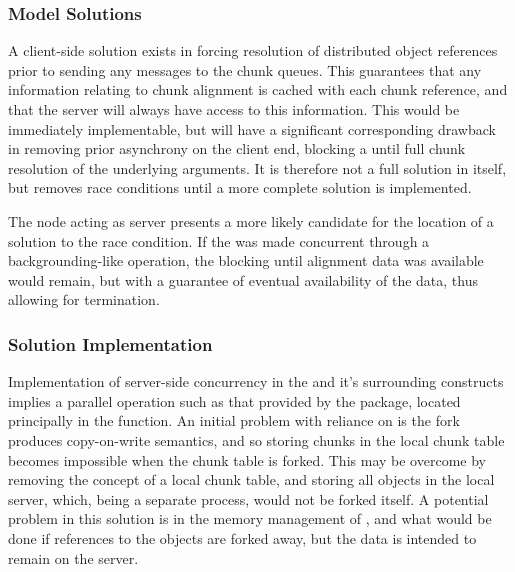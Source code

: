 
\subsubsection{Model Solutions}

A client-side solution exists in forcing resolution of distributed object
references prior to sending any messages to the chunk queues.
This guarantees that any information relating to chunk alignment is cached with
each chunk reference, and that the server will always have access to this
information.
This would be immediately implementable, but will have a significant
corresponding drawback in removing prior asynchrony on the client end, blocking
a  until full chunk resolution of the
underlying arguments.
It is therefore not a full solution in itself, but removes race conditions
until a more complete solution is implemented.

The node acting as server presents a more likely candidate for the location of
a solution to the race condition.
If the  was made concurrent through a
backgrounding-like operation, the blocking until alignment data was available
would remain, but with a guarantee of eventual availability of the data, thus
allowing for termination.

\subsubsection{Solution Implementation}

Implementation of server-side concurrency in the
 and it's surrounding constructs implies a
parallel operation such as that provided by the  package,
located principally in the  function.
An initial problem with reliance on  is the
fork produces copy-on-write semantics, and so storing chunks in the local chunk
table becomes impossible when the chunk table is forked.
This may be overcome by removing the concept of a local chunk table, and
storing all objects in the local  server, which, being a separate
process, would not be forked itself. 
A potential problem in this solution is in the memory management of
, and what would be done if references to the \R{} objects are forked
away, but the data is intended to remain on the server.

